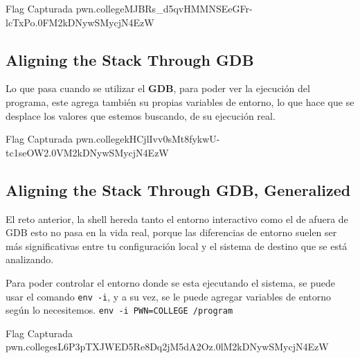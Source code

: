 \begin{flagbox}{Flag Capturada}
	pwn.college{MJBRs_d5qvHMMNSEeGFr-lcTxPo.0FM2kDNywSMycjN4EzW}
\end{flagbox}

\subsection{Aligning the Stack Through GDB}\label{subsec:10-08aligning_the_stack_through_gdb}
Lo que pasa cuando se utilizar el \textbf{GDB}, para poder ver la ejecución del programa, este agrega también
su propias variables de entorno, lo que hace que se desplace los valores que estemos buscando, de su ejecución real.
\begin{flagbox}{Flag Capturada}
	pwn.college{kHCjlIvv0sMt8fykwU-tc1seOW2.0VM2kDNywSMycjN4EzW}
\end{flagbox}

\subsection{Aligning the Stack Through GDB, Generalized}\label{subsec:10-09aligning_the_stack_through_gdb_generalized}

El reto anterior, la shell hereda tanto el entorno interactivo como el de afuera de GDB
esto no pasa en la vida real, porque las diferencias de entorno suelen ser más significativas
entre tu configuración local y el sistema de destino que se está analizando.


Para poder controlar el entorno donde se esta ejecutando el sistema, se puede usar el comando
\texttt{env -i}, y a su vez, se le puede agregar variables de entorno según lo necesitemos.
\texttt{env -i PWN=COLLEGE /program}
\begin{flagbox}{Flag Capturada}
	pwn.college{sL6P3pTXJWED5Re8Dq2jM5dA2Oz.0lM2kDNywSMycjN4EzW}
\end{flagbox}

